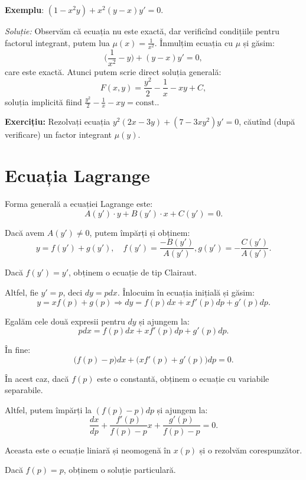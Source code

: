 \textbf{Exemplu}: $(1 - x^2 y) + x^2 (y - x) y' = 0$.

\emph{Soluție:} Observăm că ecuația nu este exactă, dar verificînd condițiile pentru factorul
integrant, putem lua $\mu(x) = \frac{1}{x^2}$. Înmulțim ecuația cu $\mu$ și găsim:
\[
  \Big( \frac{1}{x^2} - y \Big) + (y - x)y' = 0,
\]
care este exactă. Atunci putem scrie direct soluția generală:
\[
  F(x, y) = \frac{y^2}{2} - \frac{1}{x} - xy + C,
\]
soluția implicită fiind $\frac{y^2}{2} - \frac{1}{x} - xy = \text{const.}$.

\vspace{1cm}

\textbf{Exercițiu:} Rezolvați ecuația $y^2 (2x - 3y) + (7 - 3xy^2) y' = 0$, căutînd
(după verificare) un factor integrant $\mu(y)$.


\section{Ecuația Lagrange}
\label{sec:lagr}

Forma generală a ecuației Lagrange este:
\[
  A(y')\cdot y + B(y')\cdot x + C(y') = 0.
\]

Dacă avem $A(y') \neq 0$, putem împărți și obținem:
\[
  y = f(y') + g(y'), \quad f(y') = \frac{- B(y')}{A(y')}, g(y') = -\frac{C(y')}{A(y')}.
\]

Dacă $f(y') = y'$, obținem o ecuație de tip Clairaut.

Altfel, fie $y' = p$, deci $dy = pdx$. Înlocuim în ecuația inițială și găsim:
\[
  y = xf(p) + g(p) \Rightarrow dy = f(p) dx + xf'(p) dp + g'(p) dp.
\]

Egalăm cele două expresii pentru $dy$ și ajungem la:
\[
  pdx = f(p) dx + xf'(p) dp + g'(p) dp.
\]

În fine:
\[
  \big( f(p) - p \big) dx + \big( xf'(p) + g'(p) \big) dp = 0.
\]

În acest caz, dacă $f(p)$ este o constantă, obținem o ecuație cu variabile separabile.

Altfel, putem împărți la $(f(p) - p) dp$ și ajungem la:
\[
  \frac{dx}{dp} + \frac{f'(p)}{f(p) - p} x + \frac{g'(p)}{f(p) - p} = 0.
\]

Aceasta este o ecuație liniară și neomogenă în $x(p)$ și o rezolvăm corespunzător.

Dacă $f(p) = p$, obținem o soluție particulară.

\vspace{1cm}

